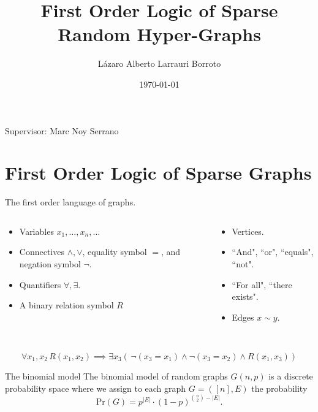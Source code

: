 \documentclass[11pt]{beamer}
\title[First Order Logic of Sparse Random Hyper-Graphs]{First Order
	Logic of Sparse Random Hyper-Graphs}
\author{L\'azaro Alberto Larrauri Borroto}
\date\today
\begin{document}
\begin{frame}[plain]
	\maketitle
	\small
	\begin{center}
	Supervisor: Marc Noy Serrano
	\end{center}

\end{frame}
	\frame{\tableofcontents}


	\section{First Order Logic of Sparse Graphs}
	\begin{frame}{The first order language of graphs.}
		\begin{columns}
			\begin{column}{0.55\textwidth}
				\begin{itemize}
					\item Variables $x_1, \dots, x_n, \dots$
					\item Connectives $\wedge, \vee$, equality symbol $=$,
					and negation symbol $\neg$.
					\item Quantifiers $\forall, \exists$.
					\item A binary relation symbol $R$
				\end{itemize}
			\end{column}
			\begin{column}{0.45\textwidth}
				\begin{itemize}
					\item Vertices.
					\item ``And", ``or", ``equals", ``not".
					\item ``For all", ``there exists".
					\item Edges $x\sim y$. 
				\end{itemize}
			\end{column}
		\end{columns}
		~\\
		\[ \forall x_1,x_2 \, R(x_1,x_2) \implies \exists x_3 (\,
		\neg(x_3=x_1)\wedge \neg(x_3=x_2) \wedge R(x_1, x_3))\]
	\end{frame}

	\begin{frame}{The binomial model}
	The binomial model of random graphs $G(n,p)$ is a discrete probability space where 
	we assign to each graph $G=([n],E)$ the probability
	\[\mathrm{Pr}(G)= p^{|E|}\cdot (1-p)^{\binom{n}{2}- |E| }. \]
	\end{frame}
\end{document}

